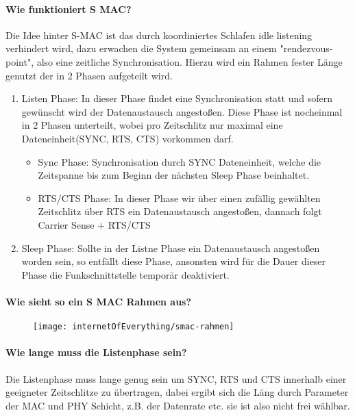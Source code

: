 	\paragraph{Wie funktioniert S\- MAC?} 
	Die Idee hinter S-MAC ist das durch koordiniertes Schlafen idle listening verhindert wird, dazu erwachen die System gemeinsam an einem "rendezvous-point", also eine zeitliche Synchronisation.
	Hierzu wird ein Rahmen fester Länge genutzt der in 2 Phasen aufgeteilt wird.
	\begin{enumerate}
		\item Listen Phase: In dieser Phase findet eine Synchronisation statt und sofern gewünscht wird der Datenaustausch angestoßen. Diese Phase ist nocheinmal in 2 Phasen unterteilt, wobei pro Zeitschlitz nur maximal eine Dateneinheit(SYNC, RTS, CTS) vorkommen darf.
		\begin{itemize}
			\item Sync\- Phase: Synchronisation durch SYNC Dateneinheit, welche die Zeitspanne bis zum Beginn der nächsten Sleep Phase beinhaltet.
			\item RTS/CTS Phase: In dieser Phase wir über einen zufällig gewählten Zeitschlitz über RTS ein Datenaustausch angestoßen, dannach folgt Carrier Sense + RTS/CTS 
		\end{itemize}
		\item Sleep Phase: Sollte in der Listne Phase ein Datenaustausch angestoßen worden sein, so entfällt diese Phase, ansonsten wird für die Dauer dieser Phase die Funkschnittstelle temporär deaktiviert.
	\end{enumerate}
	
	\paragraph{Wie sieht so ein S\- MAC Rahmen aus?}
	
	
	\begin{figure}[H]
	\texttt{[image: internetOfEverything/smac-rahmen]}
	\end{figure}
	
	\paragraph{Wie lange muss die Listenphase sein?}
	Die Listenphase muss lange genug sein um SYNC, RTS und CTS innerhalb einer geeigneter Zeitschlitze zu übertragen, dabei ergibt sich die Läng durch Parameter der MAC und PHY Schicht, z.B. der Datenrate etc. sie ist also nicht frei wählbar.
	
